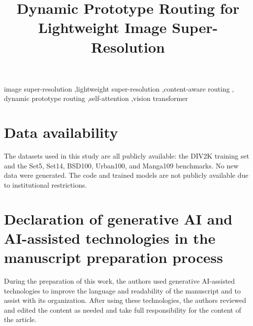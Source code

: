 \documentclass[final,5p,times,twocolumn]{elsarticle}
\begin{document}
\begin{frontmatter}

\title{Dynamic Prototype Routing for Lightweight Image Super-Resolution}



\begin{keyword}
image super-resolution \sep lightweight super-resolution \sep content-aware routing \sep
dynamic prototype routing \sep self-attention \sep vision transformer
\end{keyword}

\end{frontmatter}

\linenumbers


























\section*{Data availability}
The datasets used in this study are all publicly available: the DIV2K training set and
the Set5, Set14, BSD100, Urban100, and Manga109 benchmarks. No new data were generated.
The code and trained models are not publicly available due to institutional restrictions.

\section*{Declaration of generative AI and AI-assisted technologies in the
manuscript preparation process}
During the preparation of this work, the authors used generative AI-assisted technologies
to improve the language and readability of the manuscript and to assist with its
organization. After using these technologies, the authors reviewed and edited the content
as needed and take full responsibility for the content of the article.



\end{document}
